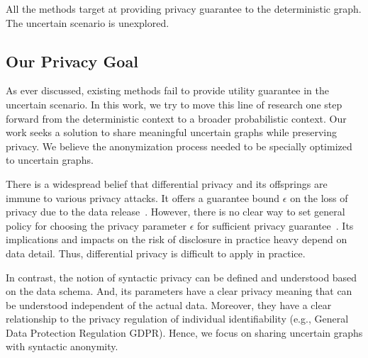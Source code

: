 All the methods target at providing privacy guarantee to the deterministic graph. 
The uncertain scenario is unexplored. 

\subsection{Our Privacy Goal}
As ever discussed, existing methods fail to provide utility guarantee in the uncertain scenario. 
In this work, we try to move this line of research one step forward from the deterministic context to a broader probabilistic context. 
Our work seeks a solution to share meaningful uncertain graphs while preserving privacy.
We believe the anonymization process needed to be specially optimized to uncertain graphs.

There is a widespread belief that differential privacy and its offsprings are immune to various privacy attacks. It offers a guarantee bound $\epsilon$ on the loss of privacy due to the data release~\cite{Sala_Sharing_2011,Xiao_Differentially_2014}. However, there is no clear way to set general policy for choosing the privacy parameter $\epsilon$ for sufficient privacy guarantee~\cite{lee2011}. Its implications and impacts on the risk of disclosure in practice heavy depend on data detail. Thus, differential privacy is difficult to apply in practice. 

In contrast, the notion of syntactic privacy can be defined and understood based on the data schema. And, its parameters have a clear privacy meaning that can be understood independent of the actual data. Moreover, they have a clear relationship to the privacy regulation of individual identifiability (e.g., General Data Protection Regulation GDPR). 
Hence, we focus on sharing uncertain graphs with syntactic anonymity. 